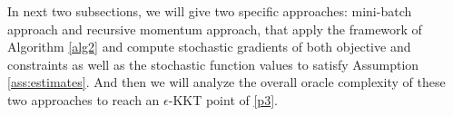 \documentclass[11pt]{article}
\newenvironment{proof}{{\noindent\it Proof.}\quad}{\hfill $\square$\par}
\begin{document}

In next two subsections, we will give two specific approaches:  mini-batch approach and recursive momentum approach, that apply the framework of Algorithm \ref{alg2} and  compute stochastic gradients of both objective and constraints as well as the stochastic function values to satisfy Assumption \ref{ass:estimates}. And then we will  analyze the  overall oracle complexity of  these two approaches  to reach an $\epsilon$-KKT point of \eqref{p3}.
\end{document}
